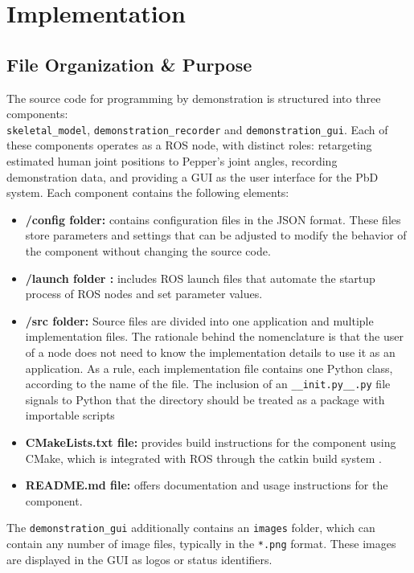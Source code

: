 \documentclass{CSSRforAfrica}
\begin{document}
\clearpage

\section{Implementation}
\subsection{File Organization \& Purpose}
\hspace{0.5cm}The source code for programming by demonstration is structured into three components: \\
\texttt{skeletal\_model}, \texttt{demonstration\_recorder} and \texttt{demonstration\_gui}. Each of these components operates as a ROS node, with distinct roles: retargeting estimated human joint positions to Pepper's joint angles, recording demonstration data, and providing a GUI as the user interface for the PbD system. Each component contains the following elements: 
\begin{itemize}
    \item \textbf{/config folder:} contains configuration files in the JSON format. These files store parameters and settings that can be adjusted to modify the behavior of the component without changing the source code.
    \item \textbf{/launch folder :} includes ROS launch files that automate the startup process of ROS nodes and set parameter values.
    \item \textbf{/src folder:} Source files are divided into one application and multiple implementation files. The rationale behind the nomenclature is that the user of a node does not need to know the implementation details to use it as an application. As a rule, each implementation file contains one Python class, according to the name of the file. The inclusion of an \texttt{\_\_init.py\_\_.py} file signals to Python that the directory should be treated as a package with importable scripts \cite{betterstack_initpy}
    \item \textbf{CMakeLists.txt file:} provides build instructions for the component using CMake, which is integrated with ROS through the catkin build system \cite{catkin_docs}.
    \item \textbf{README.md file:} offers documentation and usage instructions for the component. 
\end{itemize}

The \texttt{demonstration\_gui} additionally contains an \texttt{images} folder, which can contain any number of image files, typically in the \texttt{*.png} format. These images are displayed in the GUI as logos or status identifiers. 
\end{document}
